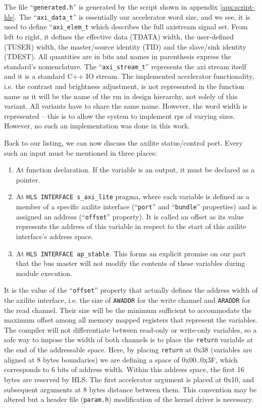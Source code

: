 The file ``\texttt{generated.h}'' is generated by the script shown in appendix \ref{apx:script-hls}.
The ``\texttt{axi\_data\_t}'' is essentially our accelerator word size, and we see, it is used
to define ``\texttt{axi\_elem\_t} which describes the full \gls{axistream} signal set.
From left to right, it defines the effective data (TDATA) width, the user-defined (TUSER)
width, the master/source identity (TID) and the slave/sink identity (TDEST). All quantities are
in bits and names in parenthesis express the standard's nomenclature. 
The ``\texttt{axi\_stream\_t}'' represents the \gls{axi} stream itself 
and it is a standard C++ IO stream. The implemented accelerator functionality, 
i.e. the contrast and brightness adjustment, is not represented in the function name as it
will be the name of the \gls{rm} in design hierarchy, not solely of this variant. All variants
have to share the same name. However, the word width is represented -- this is to allow the
system to implement \glspl{rp} of varying sizes. However, no such an implementation was done
in this work.

Back to our listing, we can now discuss the \gls{axilite} status/control port.
Every such an input must be mentioned in three places:
\begin{enumerate}
\item	At function declaration. If the variable is an output, it must be declared as a pointer.
\item	At \texttt{HLS INTERFACE s\_axi\_lite} pragma, where each variable is defined
	as a member of a specific \gls{axilite} interface (``\texttt{port}'' and ``\texttt{bundle}''
	properties) and is assigned an address (``\texttt{offset}'' property). It is called an
	offset as its value represents the address of this variable in respect to the start
	of this \gls{axilite} interface's address space.
\item	At \texttt{HLS INTERFACE ap\_stable}. This forms an explicit promise on our part
	that the bus master will not modify the contents of these variables during module execution.
\end{enumerate}

It is the value of the ``\texttt{offset}'' property that actually defines the address width
of the \gls{axilite} interface, i.e. the size of \texttt{AWADDR} for the write channel
and \texttt{ARADDR} for the read channel. Their size will be the minimum sufficient
to accommodate the maximum offset among all memory mapped registers that represent the variables.
The compiler will not differentiate between read-only or write-only variables, so a safe way
to impose the width of both channels is to place the \texttt{return} variable at the end of
the addressable space. Here, by placing \texttt{return} at 0x38 (variables are aligned at 8 bytes
boundaries) we are defining a space of 0x00..0x3F, which corresponds to 6 bits of address width.
Within this address space, the first 16 bytes are reserved by HLS. The first accelerator
argument is placed at 0x10, and subsequent arguments at 8 bytes distance between them.
This convention may be altered but a header file (\texttt{param.h}) modification
of the kernel driver is necessary.

